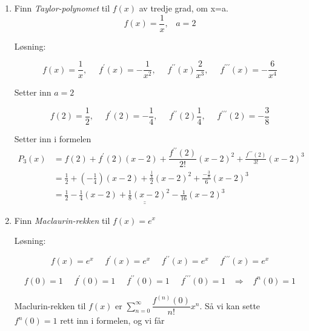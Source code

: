 \documentclass[11pt]{article}
\theoremstyle{definition}
\theoremstyle{definition}
\theoremstyle{definition}
\theoremstyle{definition}
\theoremstyle{definition}
\theoremstyle{definition}
\begin{document}
		\begin{enumerate}
			\item Finn \textit{Taylor-polynomet} til \(f(x)\) av tredje grad, om x=a. \[f(x)=\frac{1}{x}, \,\,\,\,\, a=2\]
			
			Løsning:
			
			\[f(x)=\frac{1}{x},\hspace{16pt} f^{\prime}(x)=-\frac{1}{x^2} ,\hspace{16pt} f^{\prime \prime} (x)\frac{2}{x^3},\hspace{16pt} f^{\prime \prime \prime}(x)=-\frac{6}{x^4}\]
			
			Setter inn \(a=2\)
			
			\[f(2)=\frac{1}{2},\hspace{16pt} f^{\prime}(2)=-\frac{1}{4} ,\hspace{16pt} f^{\prime \prime} (2)\frac{1}{4},\hspace{16pt} f^{\prime \prime \prime}(2)=-\frac{3}{8}\]
			
			Setter inn i formelen
			\begin{align*}
			P_3(x)&=f(2)+f^{\prime}(2)(x-2)+\dfrac{f^{\prime \prime}(2)}{2!}(x-2)^2+\frac{f^{\prime \prime \prime
				}(2)}{3!}(x-2)^3\\
			&=\frac{1}{2}+\left( -\frac{1}{4}\right) (x-2)+\frac{\frac{1}{4}}{2}(x-2)^2+\frac{-\frac{3}{8}}{6}(x-2)^3\\
			&=\underline{\underline{\frac{1}{2}-\frac{1}{4}(x-2)+\frac{1}{8}(x-2)^2-\frac{1}{16}(x-2)^3}}
			\end{align*}
			
			\item Finn \textit{Maclaurin-rekken} til \(f(x)=e^x\)
			
			Løsning:
			
			\[f(x)=e^x \hspace{16pt}f^{\prime}(x)=e^x \hspace{16pt}f^{\prime \prime}(x)=e^x \hspace{16pt} f^{\prime \prime \prime}(x)=e^x \]
			
			\[f(0)=1 \hspace{16pt}f^{\prime}(0)=1 \hspace{16pt}f^{\prime \prime}(0)=1 \hspace{16pt} f^{\prime \prime \prime}(0)=1\hspace{10pt} \Rightarrow \hspace{10pt}f^n(0)=1 \]
			
			Maclurin-rekken til \(f(x)\) er \(\sum_{n=0}^{\infty} \dfrac{f^{(n)}(0)}{n!}x^n \). Så vi kan sette \(f^n(0)=1 \) rett inn i formelen, og vi får
			

\end{enumerate}
\end{document}

